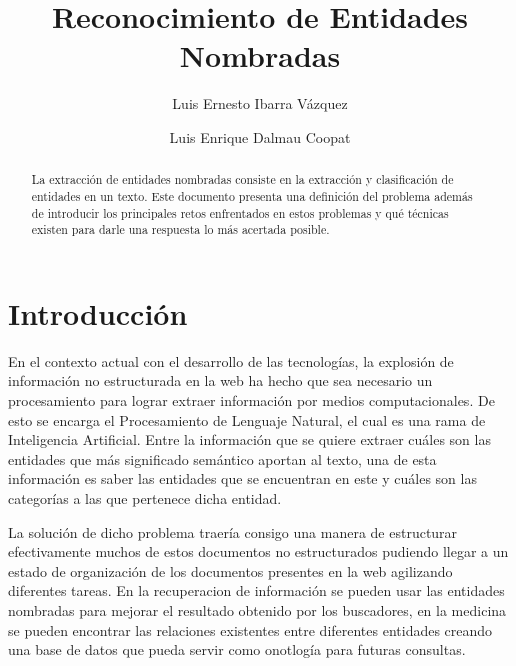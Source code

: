 \documentclass[runningheads]{llncs}
\begin{document}
%
\title{Reconocimiento de Entidades Nombradas}
%
%
\author{Luis Ernesto Ibarra Vázquez \and
Luis Enrique Dalmau Coopat}
%
%
%
\maketitle              %
%
\begin{abstract}

La extracción de entidades nombradas consiste en la extracción y clasificación de entidades en un texto. Este documento presenta una definición del problema además de introducir los principales retos enfrentados en estos problemas y qué técnicas existen para darle una respuesta lo más acertada posible. 

\end{abstract}
%
%
%
\section{Introducción}

En el contexto actual con el desarrollo de las tecnologías, la explosión de información no estructurada en la web ha hecho que sea necesario un procesamiento para lograr extraer información por medios computacionales. De esto se encarga el Procesamiento de Lenguaje Natural, el cual es una rama de Inteligencia Artificial. Entre la información que se quiere extraer cuáles son las entidades que más significado semántico aportan al texto, una de esta información es saber las entidades que se encuentran en este y cuáles son las categorías a las que pertenece dicha entidad.

La solución de dicho problema traería consigo una manera de estructurar efectivamente muchos de estos documentos no estructurados pudiendo llegar a un estado de organización de los documentos presentes en la web agilizando diferentes tareas. En la recuperacion de información se pueden usar las entidades nombradas para mejorar el resultado obtenido por los buscadores, en la medicina se pueden encontrar las relaciones existentes entre diferentes entidades creando una base de datos que pueda servir como onotlogía para futuras consultas.
\end{document}
